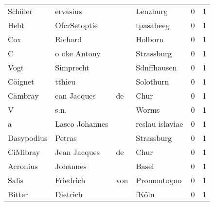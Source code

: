 \begin{tabular}{llllrr}
                  Schüler &                           ervasius &             &                                    Lenzburg &          0 &         1 \\
                     Hebt &                       OfcrSetoptie &             &                                   tpasabeeg &          0 &         1 \\
                      Cox &                            Richard &             &                                     Holborn &          0 &         1 \\
                        C &                       o oke Antony &             &                                  Strassburg &          0 &         1 \\
                     Vogt &                          Simprecht &             &                                 Sdnffhausen &          0 &         1 \\
                  Cöignet &                             tthieu &             &                                   Solothurn &          0 &         1 \\
                  Cämbray &                        ean Jacques &          de &                                        Chur &          0 &         1 \\
                        V &                               s.n. &             &                                       Worms &          0 &         1 \\
                        a &                     Lasco Johannes &             &                             reslau islaviae &          0 &         1 \\
               Dasypodius &                             Petras &             &                                  Strassburg &          0 &         1 \\
                 CiMibray &                       Jean Jacques &          de &                                        Chur &          0 &         1 \\
                 Acronius &                           Johannes &             &                                       Basel &          0 &         1 \\
                    Salis &                          Friedrich &         von &                                 Promontogno &          0 &         1 \\
                   Bitter &                           Dietrich &             &                                       fKöln &          0 &         1 \\

\end{tabular}
